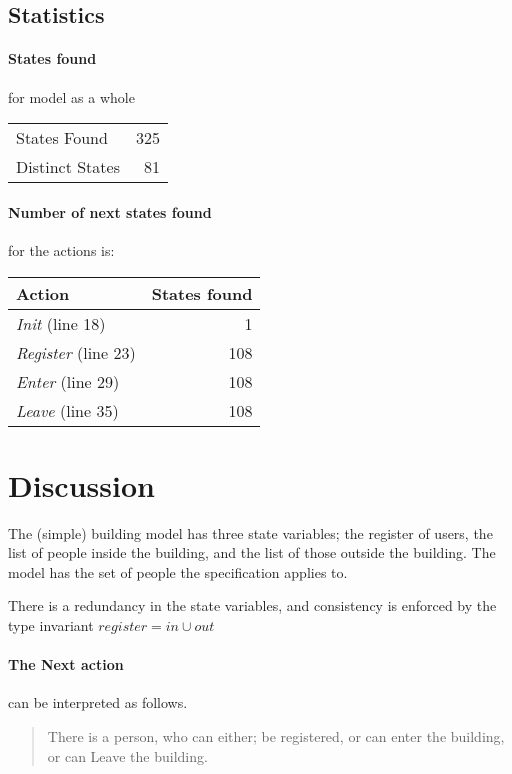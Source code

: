 \documentclass{article}
\begin{document}
\subsection{Statistics}
\paragraph{States found} for model as a whole

\begin{table}[h]
\begin{tabular}{lr}
	\hline
	States Found & 325 \\
	Distinct States & 81 \\
\hline
\end{tabular}
\end{table}

\paragraph{Number of next states found} for the actions is:

\begin{table}[h]
\begin{tabular}{lr}
	\hline
	\textbf{Action} & \textbf{States found} \\ \hline
	\textit{Init} (line 18) & 1 \\
	\textit{Register} (line 23) & 108 \\
	\textit{Enter} (line 29) & 108 \\
	\textit{Leave} (line 35) & 108 \\
	\hline
\end{tabular}
\end{table}

\section{Discussion}
The (simple) building model has three state variables; the register of users,
the list of people inside the building, and the list of those outside the
building.  The model has the set of people the specification applies to.

There is a redundancy in the state variables, and consistency is enforced by
the type invariant $\textit{register}=\textit{in}\cup\textit{out}$

\paragraph{The Next action } can be interpreted as follows.
\begin{quote}
	There is a person, who can either; be registered, or can enter the building,
	or can Leave the building.
\end{quote}
\end{document}
